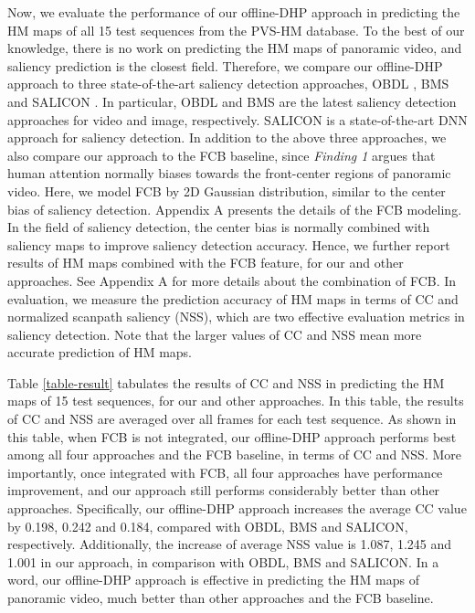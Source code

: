 \documentclass[10pt,journal,compsoc]{IEEEtran}
\begin{document}
Now, we evaluate the performance of our offline-DHP approach in predicting the HM maps of all 15 test sequences from the PVS-HM database. To the best of our knowledge, there is no work on predicting the HM maps of panoramic video, and saliency prediction is the closest field. Therefore, we compare our offline-DHP approach to three state-of-the-art saliency detection approaches, OBDL  \cite{hossein2015many}, BMS \cite{zhang2016exploiting} and SALICON \cite{huang2015salicon}.
In particular, OBDL  \cite{hossein2015many} and BMS \cite{zhang2016exploiting} are the latest saliency detection approaches for video and image, respectively.
SALICON\cite{huang2015salicon} is a state-of-the-art DNN approach for saliency detection.
In addition to the above three approaches, we also compare our approach to the FCB baseline, since \textit{Finding 1} argues that human attention normally biases towards the front-center regions of panoramic video.
Here, we model FCB by 2D Gaussian distribution, similar to the center bias of saliency detection.
Appendix A presents the details of the FCB modeling.
In the field of saliency detection, the center bias  \cite{borji2013state} is normally combined with saliency maps to improve saliency detection accuracy. Hence, we further report results of HM maps combined with the FCB feature, for our and other approaches.
See Appendix A for more details about the combination of FCB.
In evaluation, we measure the prediction accuracy of HM maps in terms of CC and normalized scanpath saliency (NSS), which are two effective evaluation metrics \textcolor{blue}{\cite{Li_2015_ICCV}} in saliency detection.
Note that the larger values of CC and NSS mean more accurate prediction of HM maps.

Table \ref{table-result} tabulates the results of CC and NSS in predicting the HM maps of 15 test sequences, for our and other approaches.
In this table, the results of CC and NSS are averaged over all frames for each test sequence.
As shown in this table, when FCB is not integrated, our offline-DHP approach performs best among all four approaches and the FCB baseline, in terms of CC and NSS.
More importantly, once integrated with FCB, all four approaches have performance improvement, and our approach still performs considerably better than other approaches.
Specifically, our offline-DHP approach increases the average CC value by 0.198, 0.242 and 0.184, compared with OBDL, BMS and SALICON, respectively.
Additionally, the increase of average NSS value is 1.087, 1.245 and 1.001 in our approach, in comparison with OBDL, BMS and SALICON.
In a word, our offline-DHP approach is effective in predicting the HM maps of panoramic video, much better than other approaches and the FCB baseline.
\end{document}
